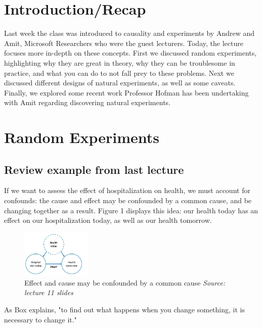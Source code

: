 
\section{Introduction/Recap}

Last week the class was introduced to causality and experiments by Andrew and Amit, Microsoft Researchers who were the guest lecturers.  Today, the lecture focuses more in-depth on these concepts. First we discussed random experiments, highlighting why they are great in theory, why they can be troublesome in practice, and what you can do to not fall prey to these problems.  Next we discussed different designs of natural experiments, as well as some caveats. Finally, we explored some recent work Professor Hofman has been undertaking with Amit regarding discovering natural experiments.

\section{Random Experiments}
\subsection{Review example from last lecture}

If we want to assess the effect of hospitalization on health, we must account for confounds: the cause and effect may be confounded by a common cause, and be changing together as a result.  Figure 1 displays this idea: our health today has an effect on our hospitalization today, as well as our health tomorrow. 

\begin{figure}[ht]
  \begin{center}
    \includegraphics[width=0.3\textwidth]{figures/fig1}
        \caption{Effect and cause may be confounded by a common cause \textit{ Source: lecture 11 slides}}
    \label{figure 1}
  \end{center}
\end{figure}

As Box explains, "to find out what happens when you change something, it is necessary to change it." 

